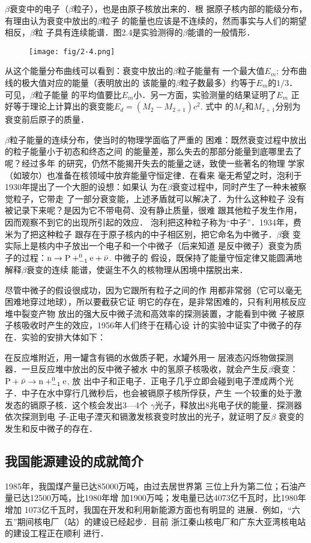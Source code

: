 $\beta$衰变中的电子（$\beta$粒子），也是由原子核放出来的．根
据原子核内部的能级分布，有理由认为衰变中放出的$\beta$粒子
的能量也应该是不连续的，然而事实与人们的期望相反，$\beta$粒
子具有连续能谱．图2.4是实验测得的$\beta$能谱的一般情形．
\begin{figure}[htp]
    \centering
\texttt{[image: fig/2-4.png]}
    \caption{}
\end{figure}

从这个能量分布曲线可以看到：衰变中放出的$\beta$粒子能量有
一个最大值$E_m$; 分布曲线的极大值对应的能量（表明放出的
该能量的$\beta$粒子数最多）约等于$E_m$的$1/3$．
可见，$\beta$粒子能量
的平均值要比$E_m$小．另一方面，实验测量的结果证明了$E_m$
正好等于理论上计算出的衰变能$E_d=(M_2-M_{2+1})c^2$. 式中
的$M_2$和$M_{2+1}$分别为衰变前后原子的质量．

$\beta$粒子能量的连续分布，使当时的物理学面临了严重的
困难：既然衰变过程中放出的粒子能量小于初态和终态之间
的能量差，那么失去的那部分能量到底哪里去了呢？经过多年
的研究，仍然不能揭开失去的能量之谜，致使一些著名的物理
学家（如玻尔）也准备在核领域中放弃能量守恒定律．在看来
毫无希望之时，泡利于1930年提出了一个大胆的设想：如果认
为在$\beta$衰变过程中，同时产生了一种未被察觉粒子，它带走
了一部分衰变能，上述矛盾就可以解决了．为什么这种粒子
没有被记录下来呢？是因为它不带电荷、没有静止质量，很难
跟其他粒子发生作用，因而观察不到它的出现所引起的效应．
泡利把这种粒子称为“中子”．1934年，费米为了把这种粒子
跟存在于原子核内的中子相区别，把它命名为中微子．$\beta$衰
变实际上是核内中子放出一个电子和一个中微子（后来知道
是反中微子）衰变为质子的过程：${\rm n}\to {\rm P}+^0_{-1}{\rm e}+\bar{\nu}$. 中微子的
假设，既保持了能量守恒定律又能圆满地解释$\beta$衰变的连续
能谱，使诞生不久的核物理从困境中摆脱出来．

尽管中微子的假设很成功，因为它跟所有粒子之间的作
用都非常弱（它可以毫无困难地穿过地球），所以要截获它证
明它的存在，是非常困难的，只有利用核反应堆中裂变产物
放出的强大反中微子流和高效率的探测装置，才能看到中微
子被原子核吸收时产生的效应，1956年人们终于在精心设
计的实验中证实了中微子的存在．实验的安排大体如下：

在反应堆附近，用一罐含有镉的水做质子靶，水罐外用一
层液态闪烁物做探测器．一旦反应堆中放出的反中微子被水
中的氢原子核吸收，就会产生反$\beta$衰变：${\rm P}+\bar{\nu}\to {\rm n}+ ^0_{-1}{\rm e}$, 放
出中子和正电子．正电子几乎立即会碰到电子湮成两个光
子．中子在水中穿行几微秒后，也会被镉原子核所俘获，产生
一个较重的处于激发态的镉原子核．这个核会发出3—4个
$\gamma$光子，释放出8兆电子伏的能量．探测器依次探测到电
子-正电子湮灭和镉激发核衰变时放出的光子，就证明了反$\beta$
衰变的发生和反中微子的存在．

\subsection{我国能源建设的成就简介}
1985年，我国煤产量已达85000万吨，由过去居世界第
三位上升为第二位；石油产量已达12500万吨，比1980年增
加1900万吨；发电量已达4073亿千瓦时，比1980年增加
1073亿千瓦时，我国在开发和利用新能源方面也有明显的
进展．例如，“六五”期间核电厂（站）的建设已经起步．目前
浙江秦山核电厂和广东大亚湾核电站的建设工程正在顺利
进行．




